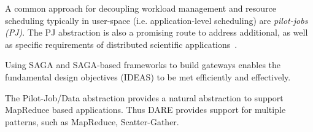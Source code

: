 \documentclass[]{svjour3}
\begin{document}
A common approach for decoupling workload management and resource
scheduling typically in user-space (i.e. application-level scheduling)
are \emph{pilot-jobs (PJ)}.  The PJ abstraction is also a promising
route to address additional, as well as specific requirements of
distributed scientific
applications~\cite{ko-efficient,bigjob_cloudcom10}.
 
Using SAGA and SAGA-based frameworks to build gateways enables the
fundamental design objectives (IDEAS) to be met efficiently and
effectively.

The Pilot-Job/Data abstraction provides a natural abstraction to
support MapReduce based applications. Thus DARE provides support for
multiple patterns, such as MapReduce, Scatter-Gather.







\end{document}
